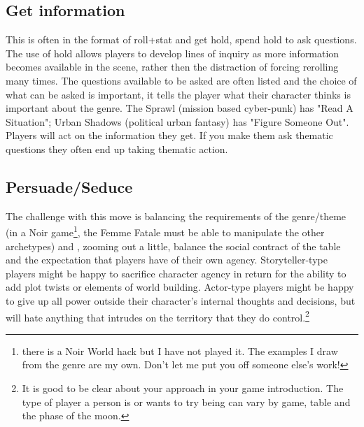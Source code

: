 \documentclass{tufte-handout}
\begin{document}
\subsection{Get information}
This is often in the format of roll+stat and get hold, spend hold to ask questions. The use of hold allows players to develop lines of inquiry as more information becomes available in the scene, rather then the distraction of forcing rerolling many times. 
The questions available to be asked are often listed and the choice of what can be asked is important, it tells the player what their character thinks is important about the genre. The Sprawl (mission based cyber-punk) has "Read A Situation"; Urban Shadows (political urban fantasy) has "Figure Someone Out".
Players will act on the information they get. If you make them ask thematic questions they often end up taking thematic action.

\subsection{Persuade/Seduce}
The challenge with this move is  balancing the requirements of the genre/theme (in a Noir game\footnote{there is a Noir World hack but I have not played it. The examples I draw from the genre are my own. Don't let me put you off someone else's work!}, the Femme Fatale must be able to manipulate the other archetypes) and , zooming out a little, balance the social contract of the table and the expectation that players have of their own agency. Storyteller-type players might be happy to sacrifice character agency in return for the ability to add plot twists or elements of world building. Actor-type players might be happy to give up all power outside their character's internal thoughts and decisions, but will hate anything that intrudes on the territory that they do control.\footnote{It is good to be clear about your approach in your game introduction. The type of player a person is or wants to try being can vary by game, table and the phase of the moon.}
\end{document}
